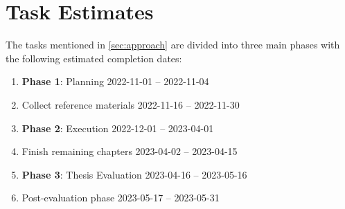 \documentclass[11pt,a4paper,oneside]{article}
\begin{document}
    \section{Task Estimates}\label{sec:tasks}
    The tasks mentioned in \autoref{sec:approach} are divided into three main phases with the following estimated completion dates:
    \renewcommand{\theenumi}{\roman{enumi}}%
    \begin{enumerate}
    \item \textbf{Phase 1}: Planning 2022-11-01 -- 2022-11-04
    \item Collect reference materials 2022-11-16 -- 2022-11-30
    \item \textbf{Phase 2}: Execution 2022-12-01 -- 2023-04-01
    \item Finish remaining chapters 2023-04-02 -- 2023-04-15
    \item \textbf{Phase 3}: Thesis Evaluation 2023-04-16 -- 2023-05-16
    \item Post-evaluation phase 2023-05-17 -- 2023-05-31
    \end{enumerate}
\end{document}
